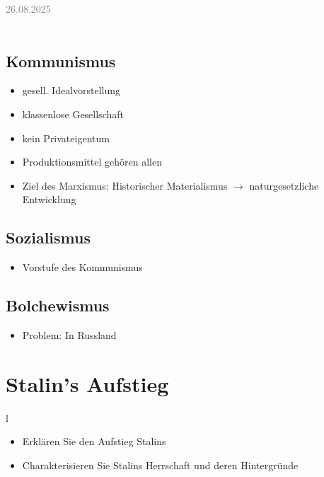 \documentclass[11pt,a4paper,oneside]{article}
\newcommand{\lessondate}[1]{
	\noindent\hfill\textcolor{gray}{\textsc{#1}} \\
	\vspace{0.5cm}
}
\begin{document}
	
	\newpage
	
	\lessondate{26.08.2025}\\
	
	\subsection*{Kommunismus}
	\begin{itemize}
		\item gesell. Idealvorstellung 
		\item klassenlose Gesellschaft 
		\item kein Privateigentum 
		\item Produktionsmittel gehören allen 
		\item Ziel des Marxismus: Historischer Materialismus $\rightarrow$ naturgesetzliche Entwicklung 
	\end{itemize}
	
	\subsection*{Sozialismus}
	\begin{itemize}
		\item Vorstufe des Kommunismus
	\end{itemize}
	
	\subsection*{Bolchewismus}
	\begin{itemize}
		\item Problem: In Russland 
	\end{itemize}
	
	\newpage
	
	\section{Stalin's Aufstieg}
	
	\begin{histaufgabe}{l}
		\begin{itemize}
			\item Erklären Sie den Aufstieg Stalins
			\item Charakterisieren Sie Stalins Herrschaft und deren Hintergründe 
		\end{itemize}
	\end{histaufgabe}
	
\end{document}
